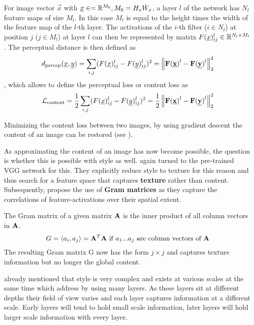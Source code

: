 For image vector $\vec{x}$ with $\underline x \in = \mathbb{R}^{M_0}, M_0 = H_x \dot W_x $, a layer $l$ of the network has $N_l$ feature maps of size $M_l$.
In this case $M_l$ is equal to the height times the width of the feature map of the $l$-th layer.
The activations of the $i$-th filter ($i \in N_l$) at position $j$ ($j \in M_l$) at layer $l$ can then be represented by matrix $F(\underline x)_{ij}^l \in \mathbb{R}^{N_l \times M_l}$.
The perceptual distance is then defined as
\begin{align}
    d_{\text{percep}}(\underline x, \underline y) = \sum_{i, j} (F(\underline x)_{ij}^l - F(\underline y)_{ij}^l)^2 = \left\lVert\mathbf{F(\underline x)}^l - \mathbf{F(\underline y)}^l\right\rVert_2^2
\end{align}
, which allows to define the perceptual loss or content loss as 
\begin{align}
    \mathcal{L}_{\text{content}} = \frac{1}{2} \sum_{i, j} (F(\underline x)_{ij}^l - F(\underline y)_{ij}^l)^2 = \frac{1}{2} \left\lVert\mathbf{F(\underline x)}^l - \mathbf{F(\underline y)}^l\right\rVert_2^2
\end{align}


Minimizing the content loss between two images, by using gradient descent the content of an image can be restored (see ).

As approximating the content of an image has now become possible, the question is whether this is possible with style as well.
\citeauthor*{gatys} again turned to the pre-trained VGG network for this.
They explicitly reduce style to texture for this reason and thus search for a feature space that captures \textbf{texture} rather than content.
Subsequently, \citeauthor*{gatys} propose the use of \textbf{Gram matrices} as they capture the correlations of feature-activations over their spatial extent.

The Gram matrix of a given matrix $\mathbf{A}$ is the inner product of all column vectors in $\mathbf{A}$.
\begin{align}
    G = \langle a_{i}, a_{j} \rangle = \mathbf{A}^T \mathbf{A} \text{ if $a_1$...$a_j$ are column vectors of $\mathbf{A}$}
\end{align}
The resulting Gram matrix G now has the form $j \times j$ and captures texture information but no longer the global content.

 already mentioned that style is very complex and exists at various scales at the same time which \citeauthor*{gatys} address by using many layers.
As these layers sit at different depths their field of view varies and each layer captures information at a different scale.
Early layers will tend to hold small scale information, later layers will hold larger scale information with every layer.

